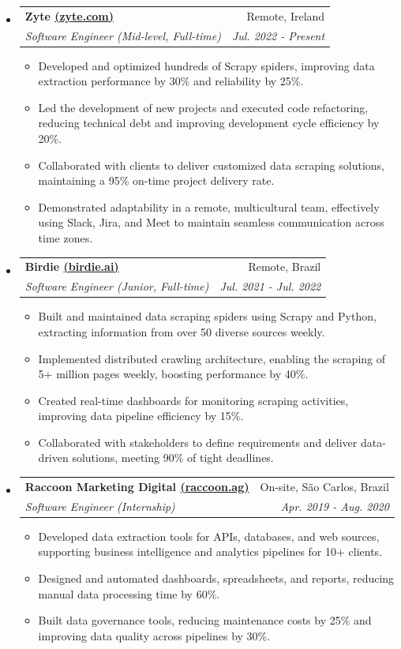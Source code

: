 \documentclass[letterpaper,11pt]{article}
\makeatletter
\newcommand{\resumeItemNoTitle}[1]{
    \item\small{
        {#1 \vspace{-2pt}}
    }
}
\newcommand{\resumeSubheading}[4]{
  \vspace{-1pt}\item
    \begin{tabular*}{0.97\textwidth}[t]{l@{\extracolsep{\fill}}r}
      \textbf{#1} & #2 \\
      \textit{\small#3} & \textit{\small #4} \\
    \end{tabular*}\vspace{-5pt}
}
\newcommand{\resumeSubHeadingListStart}{\begin{itemize}[leftmargin=*]}
\newcommand{\resumeSubHeadingListEnd}{\end{itemize}}
\newcommand{\resumeItemListStart}{\begin{itemize}[leftmargin=*]\setlength\itemsep{1mm}}
\newcommand{\resumeItemListEnd}{\end{itemize}\vspace{-5pt}}
\makeatother
\begin{document}
\resumeSubHeadingListStart
  \resumeSubheading
      {Zyte \href{https://zyte.com}{(zyte.com)}}{Remote, Ireland}
      {Software Engineer (Mid-level, Full-time)}{Jul. 2022 - Present}
      \resumeItemListStart
        \resumeItemNoTitle
            {Developed and optimized hundreds of Scrapy spiders, improving data extraction performance by 30\% and reliability by 25\%.}
        \resumeItemNoTitle
            {Led the development of new projects and executed code refactoring, reducing technical debt and improving development cycle efficiency by 20\%.}
        \resumeItemNoTitle
            {Collaborated with clients to deliver customized data scraping solutions, maintaining a 95\% on-time project delivery rate.}
        \resumeItemNoTitle
            {Demonstrated adaptability in a remote, multicultural team, effectively using Slack, Jira, and Meet to maintain seamless communication across time zones.}
      \resumeItemListEnd
  \resumeSubheading
      {Birdie \href{https://birdie.ai}{(birdie.ai)}}{Remote, Brazil}
      {Software Engineer (Junior, Full-time)}{Jul. 2021 - Jul. 2022}
      \resumeItemListStart
        \resumeItemNoTitle
          {Built and maintained data scraping spiders using Scrapy and Python, extracting information from over 50 diverse sources weekly.}
        \resumeItemNoTitle
          {Implemented distributed crawling architecture, enabling the scraping of 5+ million pages weekly, boosting performance by 40\%.}
        \resumeItemNoTitle
          {Created real-time dashboards for monitoring scraping activities, improving data pipeline efficiency by 15\%.}
        \resumeItemNoTitle
          {Collaborated with stakeholders to define requirements and deliver data-driven solutions, meeting 90\% of tight deadlines.}
      \resumeItemListEnd
  \resumeSubheading
      {Raccoon Marketing Digital \href{https://raccoon.ag}{(raccoon.ag)}}{On-site, São Carlos, Brazil}
      {Software Engineer (Internship)}{Apr. 2019 - Aug. 2020}
      \resumeItemListStart
        \resumeItemNoTitle
          {Developed data extraction tools for APIs, databases, and web sources, supporting business intelligence and analytics pipelines for 10+ clients.}
        \resumeItemNoTitle
          {Designed and automated dashboards, spreadsheets, and reports, reducing manual data processing time by 60\%.}
        \resumeItemNoTitle
          {Built data governance tools, reducing maintenance costs by 25\% and improving data quality across pipelines by 30\%.}
      \resumeItemListEnd
\resumeSubHeadingListEnd
  
\end{document}
